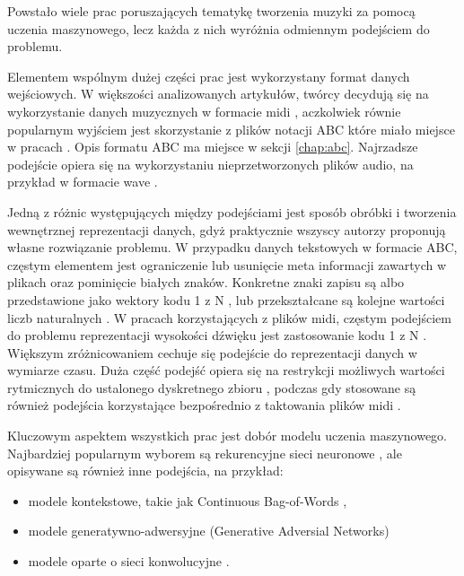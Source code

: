 {{    %
    Powstało wiele prac poruszających tematykę tworzenia muzyki za pomocą uczenia maszynowego, 
    lecz każda z nich wyróżnia odmiennym podejściem do problemu.

    Elementem wspólnym dużej części prac jest wykorzystany format danych wejściowych.
    W większości analizowanych artykułów, twórcy decydują się na wykorzystanie 
    danych muzycznych w formacie midi \cite{Hadjeres2016DeepBachAS, Mogren2016CRNNGANCR, Wu2017AHR, Yang2017MidiNetAC}, 
    aczkolwiek równie popularnym wyjściem jest skorzystanie z plików notacji ABC które miało miejsce w pracach \cite{Agarwala2017MusicCU, Sturm2015FolkMS}. 
    Opis formatu ABC ma miejsce w sekcji \ref{chap:abc}.
    Najrzadsze podejście opiera się na wykorzystaniu nieprzetworzonych plików audio, 
    na przykład w formacie wave \cite{Oord2016WaveNetAG}.
    
    Jedną z różnic występujących między podejściami jest sposób obróbki i tworzenia
    wewnętrznej reprezentacji danych, gdyż praktycznie wszyscy autorzy 
    proponują własne rozwiązanie problemu. 
    W przypadku danych tekstowych w formacie ABC, częstym elementem jest ograniczenie
    lub usunięcie meta informacji zawartych w plikach \cite{Agarwala2017MusicCU, Sturm2015FolkMS} oraz pominięcie białych znaków.
    Konkretne znaki zapisu są albo przedstawione jako wektory kodu  1\,\,z\,\,N \cite{Sturm2015FolkMS}, 
    lub przekształcane są kolejne wartości liczb naturalnych \cite{Agarwala2017MusicCU}.
    W pracach korzystających z plików midi, częstym podejściem do problemu reprezentacji wysokości
    dźwięku jest zastosowanie kodu  1\,\,z\,\,N \cite{Yang2017MidiNetAC}. Większym zróżnicowaniem cechuje się podejście
    do reprezentacji danych w wymiarze czasu. Duża część podejść opiera się na restrykcji możliwych
    wartości rytmicznych do ustalonego dyskretnego zbioru \cite{Hadjeres2016DeepBachAS, Wu2017AHR}, 
    podczas gdy stosowane są również podejścia korzystające bezpośrednio z taktowania 
    plików midi \cite{Mogren2016CRNNGANCR}.

    Kluczowym aspektem wszystkich prac jest dobór modelu uczenia maszynowego.
    Najbardziej popularnym wyborem są rekurencyjne sieci neuronowe \cite{Agarwala2017MusicCU, Mogren2016CRNNGANCR, Souza2018DeepNN, Sturm2015FolkMS},
    ale opisywane są również inne podejścia, na przykład:
    \begin{itemize}
      \setlength\itemsep{-0.5em}
      \item modele kontekstowe, takie jak Continuous Bag-of-Words \cite{Agarwala2017MusicCU},
      \item modele generatywno-adwersyjne (Generative Adversial Networks) \cite{Agarwala2017MusicCU, Mogren2016CRNNGANCR}
      \item modele oparte o sieci konwolucyjne \cite{Oord2016WaveNetAG, Yang2017MidiNetAC}.
    \end{itemize}

}}
